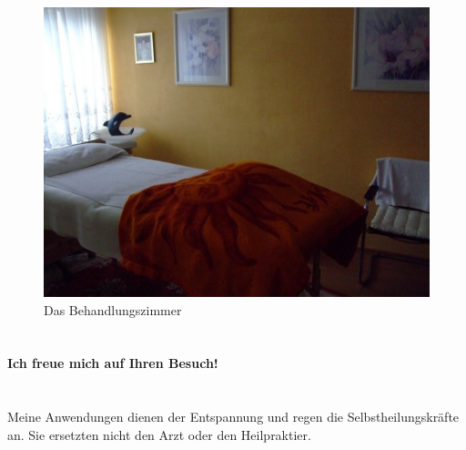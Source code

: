 \documentclass[10pt,foldmark,notumble]{leaflet}
\begin{document}
\newpage
\vfill
\begin{figure}[h]
\includegraphics [scale=.25]{Bild1.jpg}
\caption{Das Behandlungszimmer}
 \end{figure}


\section{ }
\centerline {\LARGE {\bf {Ich freue mich auf Ihren Besuch!}}}

\section{ }
Meine Anwendungen dienen der Entspannung und regen die Selbstheilungskräfte an. Sie ersetzten nicht den Arzt oder den Heilpraktier. 
\vfill

\newpage
\end{document}
